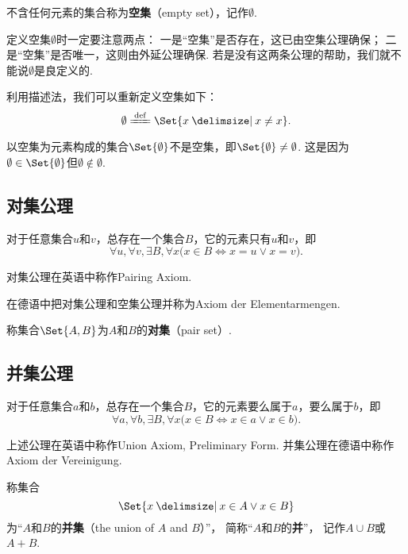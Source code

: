 \begin{definition}
不含任何元素的集合称为\textbf{空集}（empty set），记作\(\emptyset\).
\end{definition}
定义空集\(\emptyset\)时一定要注意两点：
一是“空集”是否存在，这已由空集公理确保；
二是“空集”是否唯一，这则由外延公理确保.
若是没有这两条公理的帮助，我们就不能说\(\emptyset\)是良定义的.

利用描述法，我们可以重新定义空集如下：\[
\emptyset \defeq \Set{ x \given x \neq x }.
\]

\begin{example}
以空集为元素构成的集合\(\Set{\emptyset}\)不是空集，即\(\Set{\emptyset} \neq \emptyset\).
这是因为\(\emptyset \in \Set{\emptyset}\)但\(\emptyset \notin \emptyset\).
\end{example}

\subsection{对集公理}
\begin{axiom}[对集公理]
对于任意集合\(u\)和\(v\)，总存在一个集合\(B\)，它的元素只有\(u\)和\(v\)，即\[
\forall u, \forall v, \exists B, \forall x
\bigl(
	x \in B \iff x = u \lor x = v
\bigr).
\]
\end{axiom}
对集公理在英语中称作Pairing Axiom.

在德语中把对集公理和空集公理并称为Axiom der Elementarmengen.

\begin{definition}
称集合\(\Set{ A, B }\)为\(A\)和\(B\)的\textbf{对集}（pair set）.
\end{definition}

\subsection{并集公理}
\begin{axiom}[并集公理I]
对于任意集合\(a\)和\(b\)，总存在一个集合\(B\)，它的元素要么属于\(a\)，要么属于\(b\)，即\[
\forall a, \forall b, \exists B, \forall x
\bigl(
	x \in B
	\iff
	x \in a \lor x \in b
\bigr).
\]
\end{axiom}
上述公理在英语中称作Union Axiom, Preliminary Form.
并集公理在德语中称作Axiom der Vereinigung.

\begin{definition}
称集合\[
\Set{ x \given x \in A \lor x \in B }
\]为“\(A\)和\(B\)的\textbf{并集}（the union of \(A\) and \(B\)）”，%
简称“\(A\)和\(B\)的\textbf{并}”，%
记作\(A \cup B\)或\(A+B\).
\end{definition}

